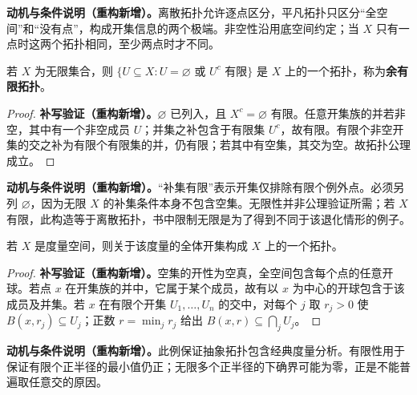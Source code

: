 \documentclass[../../main.tex]{subfiles}%
\begin{document}
\begin{remark}
\textbf{动机与条件说明（重构新增）。}离散拓扑允许逐点区分，平凡拓扑只区分“全空间”和“没有点”，构成开集信息的两个极端。非空性沿用底空间约定；当 $X$ 只有一点时这两个拓扑相同，至少两点时才不同。
\end{remark}
\begin{definition}[余有限拓扑]\label{definition:ch04-cofinite-topology}
若 $X$ 为无限集合，则 $\{U\subseteq X:U=\varnothing\text{ 或 }U^c\text{ 有限}\}$ 是 $X$ 上的一个拓扑，称为\textbf{余有限拓扑}。
\end{definition}
\begin{proof}
\textbf{补写验证（重构新增）。}$\varnothing$ 已列入，且 $X^c=\varnothing$ 有限。任意开集族的并若非空，其中有一个非空成员 $U$；并集之补包含于有限集 $U^c$，故有限。有限个非空开集的交之补为有限个有限集的并，仍有限；若其中有空集，其交为空。故拓扑公理成立。
\end{proof}
\begin{remark}
\textbf{动机与条件说明（重构新增）。}“补集有限”表示开集仅排除有限个例外点。必须另列 $\varnothing$，因为无限 $X$ 的补集条件本身不包含空集。无限性并非公理验证所需；若 $X$ 有限，此构造等于离散拓扑，书中限制无限是为了得到不同于该退化情形的例子。
\end{remark}
\begin{example}[度量诱导的拓扑]\label{example:ch04-metric-topology}
若 $X$ 是度量空间，则关于该度量的全体开集构成 $X$ 上的一个拓扑。
\end{example}
\begin{proof}
\textbf{补写验证（重构新增）。}空集的开性为空真，全空间包含每个点的任意开球。若点 $x$ 在开集族的并中，它属于某个成员，故有以 $x$ 为中心的开球包含于该成员及并集。若 $x$ 在有限个开集 $U_1,\ldots,U_n$ 的交中，对每个 $j$ 取 $r_j>0$ 使 $B(x,r_j)\subseteq U_j$；正数 $r=\min_jr_j$ 给出 $B(x,r)\subseteq\bigcap_jU_j$。
\end{proof}
\begin{remark}
\textbf{动机与条件说明（重构新增）。}此例保证抽象拓扑包含经典度量分析。有限性用于保证有限个正半径的最小值仍正；无限多个正半径的下确界可能为零，正是不能普遍取任意交的原因。
\end{remark}
\end{document}
